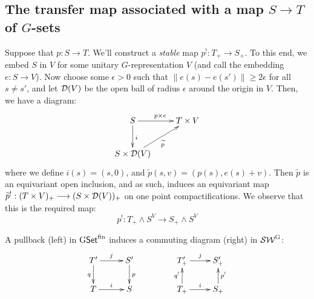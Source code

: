 \documentclass[11pt]{article}
\begin{document}
\subsection*{The transfer map associated with a map $S\to T$ of $G$-sets}
Suppose that $p:S\to T$. We'll construct a \emph{stable} map $p^!:T_+\to S_+$.  To this end, we embed $S$ in $V$ for some unitary $G$-representation $V$ (and call the embedding $e:S\to V$). Now choose some $\epsilon>0$ such that $\|e(s)-e(s')\|\geq 2\epsilon$ for all $s\neq s'$, and let $\mathcal{D}(V)$ be the open ball of radius $\epsilon$ around the origin in $V$. Then, we have a diagram:
\[\xymatrix{
S\ar[d]^i\ar[r]^{p\times e}&T\times V\\
S\times \calD(V)\ar[ur]_{\widetilde p}
}\]
where we define $i(s)=(s,0)$, and $\widetilde p(s,v)=(p(s),e(s)+v)$. Then $\widetilde p$ is an equivariant open inclusion, and as such, induces an equivariant map $\widetilde p^!:(T\times V)_+\longrightarrow (S\times \mathcal{D}(V))_+$ on one point compactifications. We observe that this is the required map:
\[p^!:T_+\wedge S^V\to S_+\wedge S^V\]
\begin{prop*}
A pullback (left) in $\operatorname{{G\mathsf{Set}^\textup{fin}}}$ induces a commuting diagram (right) in $\operatorname{{\mathcal{SW}^G}}$:
\[\xymatrix@!0@R=12mm@C=1.5cm{
\ar[d]_qT'\ar[r]^j&S'\ar[d]^p\\
T\ar[r]^i&S
}\qquad\qquad\xymatrix@!0@R=12mm@C=1.5cm{
\ar[d];[]^{q^!}T'_+\ar[r]^j&S'_+\ar[d];[]_{p^!}\\
T_+\ar[r]^i&S_+
}\]
\end{prop*}
\end{document}
